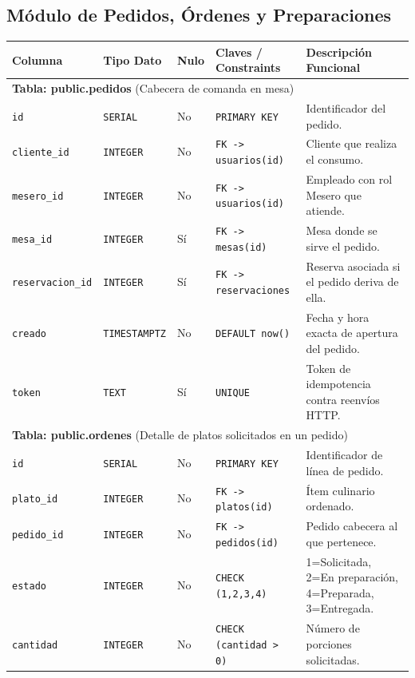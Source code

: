 \documentclass[11pt,letterpaper]{article}
\begin{document}
\subsection{Módulo de Pedidos, Órdenes y Preparaciones}

\begin{table}[h!]
\centering
\scriptsize
\begin{tabularx}{\textwidth}{l l l p{2.8cm} X}
\toprule
\textbf{Columna} & \textbf{Tipo Dato} & \textbf{Nulo} & \textbf{Claves / Constraints} & \textbf{Descripción Funcional} \\
\midrule
\multicolumn{5}{l}{\textbf{Tabla: public.pedidos} (Cabecera de comanda en mesa)} \\
\texttt{id} & \texttt{SERIAL} & No & \texttt{PRIMARY KEY} & Identificador del pedido. \\
\texttt{cliente\_id} & \texttt{INTEGER} & No & \texttt{FK -> usuarios(id)} & Cliente que realiza el consumo. \\
\texttt{mesero\_id} & \texttt{INTEGER} & No & \texttt{FK -> usuarios(id)} & Empleado con rol Mesero que atiende. \\
\texttt{mesa\_id} & \texttt{INTEGER} & Sí & \texttt{FK -> mesas(id)} & Mesa donde se sirve el pedido. \\
\texttt{reservacion\_id} & \texttt{INTEGER} & Sí & \texttt{FK -> reservaciones} & Reserva asociada si el pedido deriva de ella. \\
\texttt{creado} & \texttt{TIMESTAMPTZ} & No & \texttt{DEFAULT now()} & Fecha y hora exacta de apertura del pedido. \\
\texttt{token} & \texttt{TEXT} & Sí & \texttt{UNIQUE} & Token de idempotencia contra reenvíos HTTP. \\
\midrule
\multicolumn{5}{l}{\textbf{Tabla: public.ordenes} (Detalle de platos solicitados en un pedido)} \\
\texttt{id} & \texttt{SERIAL} & No & \texttt{PRIMARY KEY} & Identificador de línea de pedido. \\
\texttt{plato\_id} & \texttt{INTEGER} & No & \texttt{FK -> platos(id)} & Ítem culinario ordenado. \\
\texttt{pedido\_id} & \texttt{INTEGER} & No & \texttt{FK -> pedidos(id)} & Pedido cabecera al que pertenece. \\
\texttt{estado} & \texttt{INTEGER} & No & \texttt{CHECK (1,2,3,4)} & 1=Solicitada, 2=En preparación, 4=Preparada, 3=Entregada. \\
\texttt{cantidad} & \texttt{INTEGER} & No & \texttt{CHECK (cantidad > 0)} & Número de porciones solicitadas. \\

\end{tabularx}
\end{table}
\end{document}
